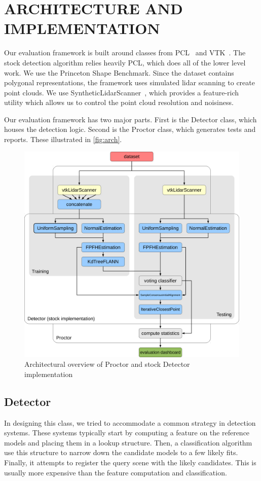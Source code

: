 \section{ARCHITECTURE AND IMPLEMENTATION}
Our evaluation framework is built around classes from PCL~\cite{PCL} and VTK~\cite{vtk}.
The stock detection algorithm relies heavily PCL, which does all of the lower level work.
We use the Princeton Shape Benchmark.
Since the dataset contains polygonal representations, the framework uses simulated lidar scanning to create point clouds. We use SyntheticLidarScanner~\cite{Doria2009}, which provides a feature-rich utility which allows us to control the point cloud resolution and noisiness.

Our evaluation framework has two major parts. First is the Detector class, which houses the detection logic. Second is the Proctor class, which generates tests and reports. These illustrated in \autoref{fig:arch}.

\begin{figure}[thpb]
  \centering
  \includegraphics[width=\columnwidth]{../figures/architecture.pdf}
  \caption{Architectural overview of Proctor and stock Detector implementation}
  \label{fig:arch}
\end{figure}

\subsection{Detector}
In designing this class, we tried to accommodate a common strategy in detection systems.
These systems typically start by computing a feature on the reference models and placing them in a lookup structure.
Then, a classification algorithm use this structure to narrow down the candidate models to a few likely fits.
Finally, it attempts to register the query scene with the likely candidates. This is usually more expensive than the feature computation and classification.

